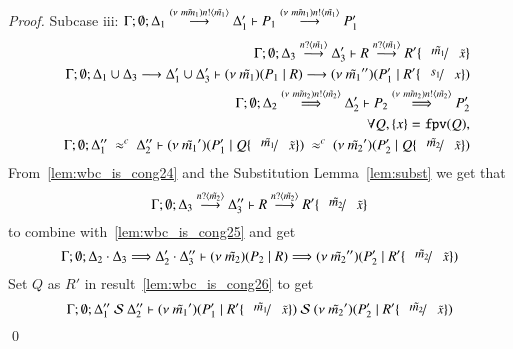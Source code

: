 \begin{proof}
	\noi Subcase iii:
	$\horel{\Gamma}{\Delta_1}{P_1}{\by{\news{\tilde{mm_1}} \bactout{n}{\tilde{m_1}}}}{\Delta_1'}{P_1'}$
%
	\begin{eqnarray}
		& & \horel{\Gamma}{\Delta_3}{R}{\by{\bactinp{n}{\tilde{m_1}}}}{\Delta_3'}{R' \subst{\tilde{m_1}}{\tilde{x}}}
		\label{lem:wbc_is_cong24}\\
		& & \horel{\Gamma}{\Delta_1 \cup \Delta_3}{\newsp{\tilde{m_1}}{P_1 \Par R}}{\by{}}{\Delta_1' \cup \Delta_3'}{\newsp{\tilde{m_1}''}{P_1' \Par R' \subst{s_1}{x}}}
		\nonumber \\
		& & \horel{\Gamma}{\Delta_2}{P_2}{\By{\news{\tilde{mm_2}} \bactout{n}{\tilde{m_2}}}}{\Delta_2'}{P_2'}
		\label{lem:wbc_is_cong25}\\
		& & \forall Q, \set{x} = \fpv{Q}, \nonumber \\
		& & \horel{\Gamma}{\Delta_1''}{\newsp{\tilde{m_1}'}{P_1' \Par Q \subst{\tilde{m_1}}{\tilde{x}}}}
		{\ \wbc\ }
		{\Delta_2''}{\newsp{\tilde{m_2}'}{P_2' \Par Q \subst{\tilde{m_2}}{\tilde{x}}}}
		\label{lem:wbc_is_cong26}
	\end{eqnarray}
%
	From~\ref{lem:wbc_is_cong24} and the Substitution Lemma~\ref{lem:subst} we get that
	\[
		\horel{\Gamma}{\Delta_3}{R}{\by{\bactinp{n}{\tilde{m_2}}}}{\Delta_3''}{R' \subst{\tilde{m_2}}{\tilde{x}}}
	\]
	\noi to combine with~\ref{lem:wbc_is_cong25} and get
	\[
		\horel{\Gamma}{\Delta_2 \cat \Delta_3}{\newsp{\tilde{m_2}}{P_2 \Par R}}
		{\By{}}
		{\Delta_2' \cat \Delta_3''}{\newsp{\tilde{m_2}''}{P_2' \Par R' \subst{\tilde{m_2}}{\tilde{x}}}}
	\]
%
	\noi Set $Q$ as $R'$ in result~\ref{lem:wbc_is_cong26} to get
%
	\[
		\horel{\Gamma}{\Delta_1''}{\newsp{\tilde{m_1}'}{P_1' \Par R' \subst{\tilde{m_1}}{\tilde{x}}}}
		{\ \mathcal{S}\ }
		{\Delta_2''}{\newsp{\tilde{m_2}'}{P_2' \Par R' \subst{\tilde{m_2}}{\tilde{x}}}}
	\]
	\qed
\end{proof}


